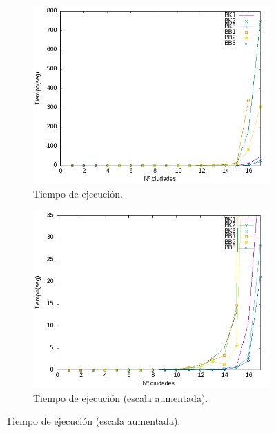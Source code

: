 \documentclass{article}
\begin{document}
\begin{figure}[H]
    \centering
    \begin{subfigure}[b]{0.45\textwidth}
        \centering
        \includegraphics[width=\textwidth]{Sucio_Olga/Comparativa_tiempos_linespoints.png}
        \caption{Tiempo de ejecución.}
    \end{subfigure}
    \begin{subfigure}[b]{0.45\textwidth}
        \centering %
        \includegraphics[width=\textwidth]{Sucio_Olga/Comparativa_tiempos_linespointsAcotado.png}
        \caption{Tiempo de ejecución (escala aumentada).}
    \end{subfigure}
\end{figure}
\end{document}
